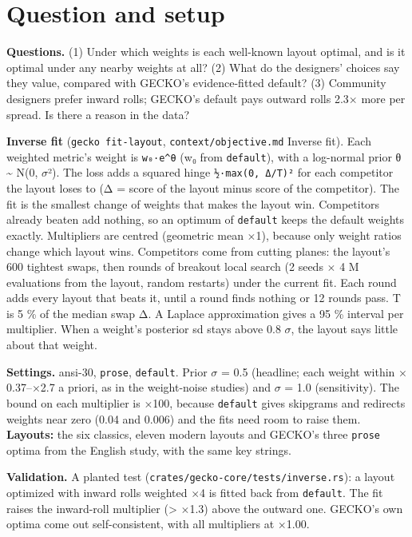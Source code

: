 \documentclass{gecko-paper}
\begin{document}
{\small
\section{Question and setup}

\textbf{Questions.} (1) Under which weights is each well-known layout optimal, and is it optimal under any nearby weights at all? (2) What do the designers' choices say they value, compared with GECKO's evidence-fitted default? (3) Community designers prefer inward rolls; GECKO's default pays outward rolls 2.3$\times$ more per spread. Is there a reason in the data?

\textbf{Inverse fit} (\texttt{gecko\ fit-layout}, \texttt{context/objective.md} Inverse fit). Each weighted metric's weight is \texttt{w₀·e\^{}θ} (w₀ from \texttt{default}), with a log-normal prior θ \textasciitilde{} N(0, $\sigma$²). The loss adds a squared hinge \texttt{½·max(0,\ Δ/T)²} for each competitor the layout loses to (Δ = score of the layout minus score of the competitor). The fit is the
smallest change of weights that makes the layout win. Competitors already beaten add nothing, so an optimum of \texttt{default} keeps the default weights exactly. Multipliers are centred (geometric mean $\times$1), because only weight ratios change which layout wins. Competitors come from cutting planes: the layout's 600 tightest swaps, then rounds of breakout local search (2 seeds $\times$ 4 M evaluations from
the layout, random restarts) under the current fit. Each round adds every layout that beats it, until a round finds nothing or 12 rounds pass. T is 5 \% of the median swap \textbar Δ\textbar. A Laplace approximation gives a 95 \% interval per multiplier. When a weight's posterior sd stays above 0.8 $\sigma$, the layout says little about that weight.

\textbf{Settings.} ansi-30, \texttt{prose}, \texttt{default}. Prior $\sigma$ = 0.5 (headline; each weight within $\times$0.37–$\times$2.7 a priori, as in the weight-noise studies) and $\sigma$ = 1.0 (sensitivity). The bound on each multiplier is $\times$100, because \texttt{default} gives skipgrams and redirects weights near zero (0.04 and 0.006) and the fits need room to raise them. \textbf{Layouts:} the six classics, eleven
modern layouts and GECKO's three \texttt{prose} optima from the English study, with the same key strings.

\textbf{Validation.} A planted test (\texttt{crates/gecko-core/tests/inverse.rs}): a layout optimized with inward rolls weighted $\times$4 is fitted back from \texttt{default}. The fit raises the inward-roll multiplier (\textgreater{} $\times$1.3) above the outward one. GECKO's own optima come out self-consistent, with all multipliers at $\times$1.00.

}
\end{document}
